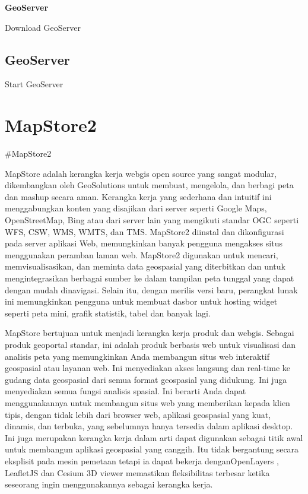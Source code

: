 \documentclass[]{book}
\begin{document}
\textbf{GeoServer}

\label{fig:embed2}Download GeoServer

\hypertarget{geoserver-1}{%
\section{GeoServer}\label{geoserver-1}}

\label{fig:embed3}Start GeoServer

\hypertarget{hari_kedelapann}{%
\chapter{MapStore2}\label{hari_kedelapann}}

\#MapStore2

MapStore adalah kerangka kerja webgis open source yang sangat modular, dikembangkan oleh GeoSolutions untuk membuat, mengelola, dan berbagi peta dan mashup secara aman. Kerangka kerja yang sederhana dan intuitif ini menggabungkan konten yang disajikan dari server seperti Google Maps, OpenStreetMap, Bing atau dari server lain yang mengikuti standar OGC seperti WFS, CSW, WMS, WMTS, dan TMS. MapStore2 diinstal dan dikonfigurasi pada server aplikasi Web, memungkinkan banyak pengguna mengakses situs menggunakan peramban laman web. MapStore2 digunakan untuk mencari, memvisualisasikan, dan meminta data geospasial yang diterbitkan dan untuk mengintegrasikan berbagai sumber ke dalam tampilan peta tunggal yang dapat dengan mudah dinavigasi. Selain itu, dengan merilis versi baru, perangkat lunak ini memungkinkan pengguna untuk membuat dasbor untuk hosting widget seperti peta mini, grafik statistik, tabel dan banyak lagi.

MapStore bertujuan untuk menjadi kerangka kerja produk dan webgis. Sebagai produk geoportal standar, ini adalah produk berbasis web untuk visualisasi dan analisis peta yang memungkinkan Anda membangun situs web interaktif geospasial atau layanan web. Ini menyediakan akses langsung dan real-time ke gudang data geospasial dari semua format geospasial yang didukung. Ini juga menyediakan semua fungsi analisis spasial. Ini berarti Anda dapat menggunakannya untuk membangun situs web yang memberikan kepada klien tipis, dengan tidak lebih dari browser web, aplikasi geospasial yang kuat, dinamis, dan terbuka, yang sebelumnya hanya tersedia dalam aplikasi desktop. Ini juga merupakan kerangka kerja dalam arti dapat digunakan sebagai titik awal untuk membangun aplikasi geospasial yang canggih. Itu tidak bergantung secara eksplisit pada mesin pemetaan tetapi ia dapat bekerja denganOpenLayers , LeafletJS dan Cesium 3D viewer memastikan fleksibilitas terbesar ketika seseorang ingin menggunakannya sebagai kerangka kerja.
\end{document}
